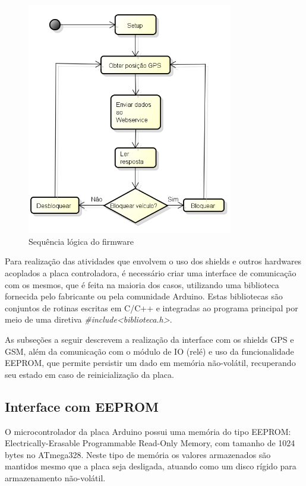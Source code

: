 \begin{figure}[!htb]
\centering
\includegraphics[width=0.8\textwidth]{figures/atividades_hl.png}
\caption{Sequência lógica do firmware}
\label{1}
\end{figure}

Para realização das atividades que envolvem o uso dos shields e outros hardwares acoplados a placa controladora, é necessário criar uma interface de comunicação com os mesmos, que é feita na maioria dos casos, utilizando uma biblioteca fornecida pelo fabricante ou pela comunidade Arduino. Estas bibliotecas são conjuntos de rotinas escritas em C/C++ e integradas ao programa principal por meio de uma diretiva \emph{\#include<biblioteca.h>}.

As subseções a seguir descrevem a realização da interface com os shields GPS e GSM, além da comunicação com o módulo de IO (relé) e uso da funcionalidade EEPROM, que permite persistir um dado em memória não-volátil, recuperando seu estado em caso de reinicialização da placa.

\subsection{Interface com EEPROM}

O microcontrolador da placa Arduino possui uma memória do tipo EEPROM: Electrically-Erasable Programmable Read-Only Memory, com tamanho de 1024 bytes no ATmega328. Neste tipo de memória os valores armazenados são mantidos mesmo que a placa seja desligada, atuando como um disco rígido para armazenamento não-volátil.

